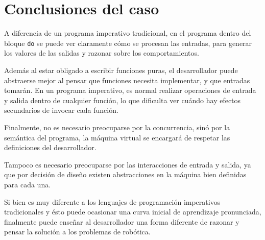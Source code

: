 



\section {Conclusiones del caso}

  A diferencia de un programa imperativo tradicional, en el programa
\frob{} dentro del bloque \texttt{do} se puede ver claramente cómo
se procesan las entradas, para generar los valores de las salidas y
razonar sobre los comportamientos.

  Además al estar obligado a escribir funciones puras, el desarrollador
puede abstraerse mejor al pensar que funciones necesita implementar,
y que entradas tomarán. En un programa imperativo, es normal realizar
operaciones de entrada y salida dentro de cualquier función, lo que
dificulta ver cuándo hay efectos secundarios de invocar cada función.

  Finalmente, no es necesario preocuparse por la concurrencia, sinó
por la semántica del programa, la máquina virtual se encargará de
respetar las definiciones del desarrollador.

  Tampoco es necesario preocuparse por las interacciones de entrada
y salida, ya que por decisión de diseño existen abstracciones en
la máquina bien definidas para cada una.

  Si bien \frob{} es muy diferente a los lenguajes de
programación imperativos tradicionales y ésto puede ocasionar una
curva inicial de aprendizaje pronunciada, finalmente puede enseñar al
desarrollador una forma diferente de razonar y pensar la solución
a los problemas de robótica.
